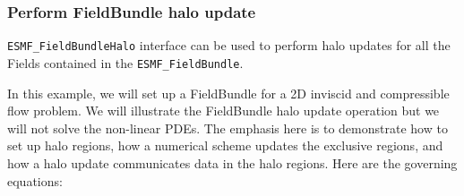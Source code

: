  
\setlength{\oldparskip}{\parskip}
\setlength{\parskip}{1.5ex}
\setlength{\oldparindent}{\parindent}
\setlength{\parindent}{0pt}
\setlength{\oldbaselineskip}{\baselineskip}
\setlength{\baselineskip}{11pt}
 
\def\bv{\begin{verbatim}}
\def\ev{\end{verbatim}}
\def\be{\begin{equation}}
\def\ee{\end{equation}}
\def\bea{\begin{eqnarray}}
\def\eea{\end{eqnarray}}
\def\bi{\begin{itemize}}
\def\ei{\end{itemize}}
\def\bn{\begin{enumerate}}
\def\en{\end{enumerate}}
\def\bd{\begin{description}}
\def\ed{\end{description}}
\def\({\left (}
\def\){\right )}
\def\[{\left [}
\def\]{\right ]}
\def\<{\left  \langle}
\def\>{\right \rangle}
\def\cI{{\cal I}}
\def\diag{\mathop{\rm diag}}
\def\tr{\mathop{\rm tr}}


 

   \subsubsection{Perform FieldBundle halo update}
   \label{sec:fieldbundle:usage:halo}
  
  \begin{sloppypar}
   {\tt ESMF\_FieldBundleHalo} interface can be used to perform halo updates
   for all the Fields contained in the {\tt ESMF\_FieldBundle}.
  \end{sloppypar}
   
  
   In this example, we will set up a FieldBundle for a 2D inviscid and compressible
   flow problem. We will illustrate the FieldBundle halo update operation but we will
   not solve the non-linear PDEs. The emphasis here is to demonstrate
   how to set up halo regions, how a numerical scheme updates
   the exclusive regions, and how a halo update communicates data in the halo regions. Here
   are the governing equations:
  
